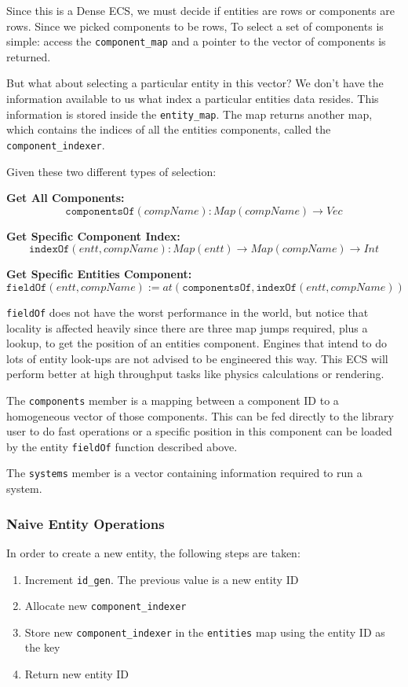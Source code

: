 Since this is a Dense ECS, we must decide if entities are rows or components are rows. Since we picked components to be rows, To select a set of components is simple: access the \texttt{component\_map} and a pointer to the vector of components is returned. 

But what about selecting a particular entity in this vector? We don't have the information available to us what index a particular entities data resides. This information is stored inside the \texttt{entity\_map}. The map returns another map, which contains the indices of all the entities components, called the \texttt{component\_indexer}. 

Given these two different types of selection:

\textbf{Get All Components:} 
$$\texttt{componentsOf}(compName) : Map(compName) \rightarrow Vec $$

\textbf{Get Specific Component Index:} 
$$\texttt{indexOf}(entt, compName): Map(entt) \rightarrow Map(compName) \rightarrow Int$$

\textbf{Get Specific Entities Component:} 
$$\texttt{fieldOf}(entt, compName) := at(\texttt{componentsOf}, \texttt{indexOf}(entt, compName))$$

\texttt{fieldOf} does not have the worst performance in the world, but notice that locality is affected heavily since there are three map jumps required, plus a lookup, to get the position of an entities component. Engines that intend to do lots of entity look-ups are not advised to be engineered this way. This ECS will perform better at high throughput tasks like physics calculations or rendering.

The \texttt{components} member is a mapping between a component ID to a homogeneous vector of those components. This can be fed directly to the library user to do fast operations or a specific position in this component can be loaded by the entity \texttt{fieldOf} function described above.

The \texttt{systems} member is a vector containing information required to run a system.

\subsubsection{Naive Entity Operations}
In order to create a new entity, the following steps are taken:
\begin{enumerate}
    \item Increment \texttt{id\_gen}. The previous value is a new entity ID
    \item Allocate new \texttt{component\_indexer}
    \item Store new \texttt{component\_indexer} in the \texttt{entities} map using the entity ID as the key
    \item Return new entity ID
\end{enumerate}

